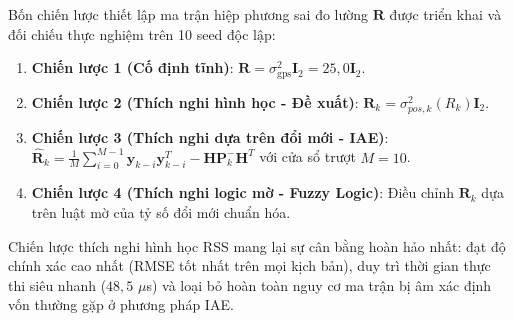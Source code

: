 \hspace{0.5cm} Bốn chiến lược thiết lập ma trận hiệp phương sai đo lường $\mathbf{R}$ được triển khai và đối chiếu thực nghiệm trên 10 seed độc lập:
\begin{enumerate}
    \item \textbf{Chiến lược 1 (Cố định tĩnh)}: $\mathbf{R} = \sigma_{\text{gps}}^2 \mathbf{I}_2 = 25{,}0 \mathbf{I}_2$.
    \item \textbf{Chiến lược 2 (Thích nghi hình học - Đề xuất)}: $\mathbf{R}_k = \sigma_{pos,k}^2(R_k) \mathbf{I}_2$.
    \item \textbf{Chiến lược 3 (Thích nghi dựa trên đổi mới - IAE)}: $\hat{\mathbf{R}}_k = \frac{1}{M}\sum_{i=0}^{M-1} \mathbf{y}_{k-i} \mathbf{y}_{k-i}^T - \mathbf{H} \mathbf{P}_k^- \mathbf{H}^T$ với cửa sổ trượt $M = 10$.
    \item \textbf{Chiến lược 4 (Thích nghi logic mờ - Fuzzy Logic)}: Điều chỉnh $\mathbf{R}_k$ dựa trên luật mờ của tỷ số đổi mới chuẩn hóa.
\end{enumerate}

\begin{table}[H]
\centering
\caption{So sánh toàn diện giữa các chiến lược thiết lập ma trận hiệp phương sai đo lường $\mathbf{R}$}
\label{tab:adaptive-strategies-comparison}
\end{table}

Chiến lược thích nghi hình học RSS mang lại sự cân bằng hoàn hảo nhất: đạt độ chính xác cao nhất (RMSE tốt nhất trên mọi kịch bản), duy trì thời gian thực thi siêu nhanh ($48{,}5$ $\mu$s) và loại bỏ hoàn toàn nguy cơ ma trận bị âm xác định vốn thường gặp ở phương pháp IAE.

